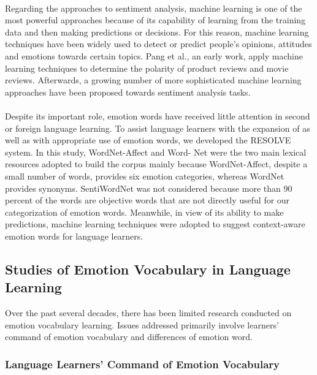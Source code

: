 \documentclass[a4paper,12pt,oneside]{article}
\begin{document}
\paragraph{}
Regarding the approaches to sentiment analysis, machine learning is one of the most powerful approaches because of its capability of learning from the training data and then making predictions or decisions. For this reason, machine learning techniques have been widely used to detect or predict people’s opinions, attitudes and emotions towards certain topics. Pang et al., an early work, apply machine learning techniques to determine the polarity of product reviews and movie reviews. Afterwards, a growing number of more sophisticated machine learning approaches have been proposed towards sentiment analysis tasks.
\paragraph{}
Despite its important role, emotion words have received little attention in second or foreign language learning. To assist language learners with the expansion of as well as with appropriate use of emotion words, we developed the RESOLVE system. In this study, WordNet-Affect and Word- Net were the two main lexical resources adopted to build the corpus mainly because WordNet-Affect, despite a small number of words, provides six emotion categories, whereas WordNet provides synonyms. SentiWordNet was not considered because more than 90 percent of the words are objective words that are not directly useful for our categorization of emotion words. Meanwhile, in view of its ability to make predictions, machine learning techniques were adopted to suggest context-aware emotion words for language learners.

\subsection{Studies of Emotion Vocabulary in Language Learning}
Over the past several decades, there has been limited research conducted on emotion vocabulary learning. Issues addressed primarily involve learners’ command of emotion vocabulary and differences of emotion word. 
\subsubsection{Language Learners’ Command of Emotion Vocabulary}
\end{document}
